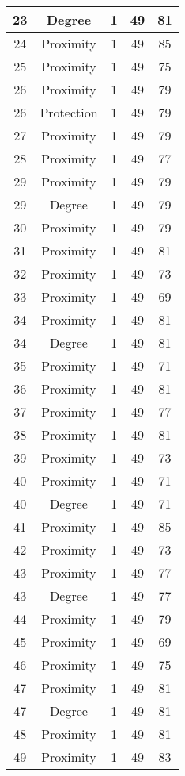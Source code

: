 \documentclass[results.tex]{subfiles}
\begin{document}
\begin{center}
\begin{tabular}{| c || c | c | c | c |}
    \hline
    23 & Degree & 1 & 49 & 81 \\ 
    \hline
    24 & Proximity & 1 & 49 & 85 \\ 
    \hline
    25 & Proximity & 1 & 49 & 75 \\ 
    \hline
    26 & Proximity & 1 & 49 & 79 \\ 
    \hline
    26 & Protection & 1 & 49 & 79 \\ 
    \hline
    27 & Proximity & 1 & 49 & 79 \\ 
    \hline
    28 & Proximity & 1 & 49 & 77 \\ 
    \hline
    29 & Proximity & 1 & 49 & 79 \\ 
    \hline
    29 & Degree & 1 & 49 & 79 \\ 
    \hline
    30 & Proximity & 1 & 49 & 79 \\ 
    \hline
    31 & Proximity & 1 & 49 & 81 \\ 
    \hline
    32 & Proximity & 1 & 49 & 73 \\ 
    \hline
    33 & Proximity & 1 & 49 & 69 \\ 
    \hline
    34 & Proximity & 1 & 49 & 81 \\ 
    \hline
    34 & Degree & 1 & 49 & 81 \\ 
    \hline
    35 & Proximity & 1 & 49 & 71 \\ 
    \hline
    36 & Proximity & 1 & 49 & 81 \\ 
    \hline
    37 & Proximity & 1 & 49 & 77 \\ 
    \hline
    38 & Proximity & 1 & 49 & 81 \\ 
    \hline
    39 & Proximity & 1 & 49 & 73 \\ 
    \hline
    40 & Proximity & 1 & 49 & 71 \\ 
    \hline
    40 & Degree & 1 & 49 & 71 \\ 
    \hline
    41 & Proximity & 1 & 49 & 85 \\ 
    \hline
    42 & Proximity & 1 & 49 & 73 \\ 
    \hline
    43 & Proximity & 1 & 49 & 77 \\ 
    \hline
    43 & Degree & 1 & 49 & 77 \\ 
    \hline
    44 & Proximity & 1 & 49 & 79 \\ 
    \hline
    45 & Proximity & 1 & 49 & 69 \\ 
    \hline
    46 & Proximity & 1 & 49 & 75 \\ 
    \hline
    47 & Proximity & 1 & 49 & 81 \\ 
    \hline
    47 & Degree & 1 & 49 & 81 \\ 
    \hline
    48 & Proximity & 1 & 49 & 81 \\ 
    \hline
    49 & Proximity & 1 & 49 & 83 \\ 
    \hline   \end{tabular}
\end{center}
\end{document}
